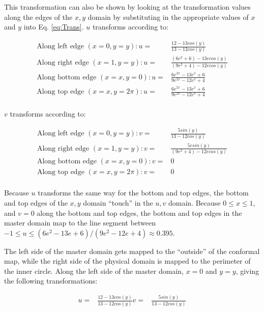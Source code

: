 \documentclass[10pt]{article}
\begin{document}
This transformation can also be shown by looking at the transformation values along the edges of the \(x,y\) domain by substituting in the appropriate values of \(x\) and \(y\) into Eq. \eqref{eq:Trans}. \(u\) transforms according to: 

\begin{equation}
\begin{aligned}
\textrm{Along left edge } (x=0, y=y): u=& \frac{12-13cos(y)}{13-12cos(y)}\\
\textrm{Along right edge } (x=1, y=y): u=& \frac{(6e^{2}+6)-13ecos(y)}{(9e^{2}+4)-12ecos(y)}\\
\textrm{Along bottom edge } (x=x, y=0): u=& \frac{6e^{2x}-13e^x+6}{9e^{2x}-12e^x+4}\\
\textrm{Along top edge } (x=x, y=2\pi): u=& \frac{6e^{2x}-13e^x+6}{9e^{2x}-12e^x+4}\\
\end{aligned}
\end{equation}

\(v\) transforms according to:

\begin{equation}
\begin{aligned}
\textrm{Along left edge } (x=0, y=y): v=& \frac{5sin(y)}{13-12cos(y)}\\
\textrm{Along right edge } (x=1, y=y): v=& \frac{5esin(y)}{(9e^{2}+4)-12ecos(y)}\\
\textrm{Along bottom edge } (x=x, y=0): v=& 0\\
\textrm{Along top edge } (x=x, y=2\pi): v=& 0\\
\end{aligned}
\end{equation}

Because \(u\) transforms the same way for the bottom and top edges, the bottom and top edges of the \(x,y\) domain ``touch'' in the \(u,v\) domain. Because \(0\leq x\leq1\), and \(v=0\) along the bottom and top edges, the bottom and top edges in the master domain map to the line segment between \(-1\leq u\leq (6e^2-13e+6)/(9e^2-12e+4)\approx 0.395\). 

The left side of the master domain gets mapped to the ``outside'' of the conformal map, while the right side of the physical domain is mapped to the perimeter of the inner circle. Along the left side of the master domain, \(x=0\) and \(y=y\), giving the following transformations:

\begin{equation}
\begin{aligned}
u=& \frac{12-13cos(y)}{13-12cos(y)}
v=& \frac{5sin(y)}{13-12cos(y)}\\
\end{aligned}
\end{equation}
\end{document}

